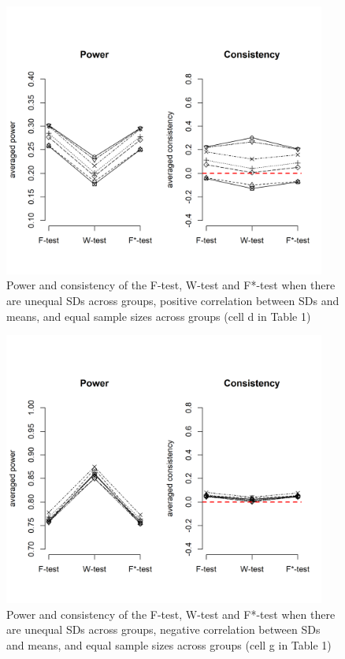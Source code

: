 \documentclass[man,floatsintext]{apa6}
\begin{document}
\begin{figure}
\includegraphics[width=400px]{Rmarkdown folder/Rmarkdown inputs/Fig2d} \caption{Power and consistency of the F-test, W-test and F*-test when there are unequal SDs across groups, positive correlation between SDs and means, and equal sample sizes across groups (cell d in Table 1)}\label{fig:unnamed-chunk-9}
\end{figure}

\begin{figure}
\includegraphics[width=400px]{Rmarkdown folder/Rmarkdown inputs/Fig2e} \caption{Power and consistency of the F-test, W-test and F*-test when there are unequal SDs across groups, negative correlation between SDs and means, and equal sample sizes across groups (cell g in Table 1)}\label{fig:unnamed-chunk-10}
\end{figure}
\end{document}
